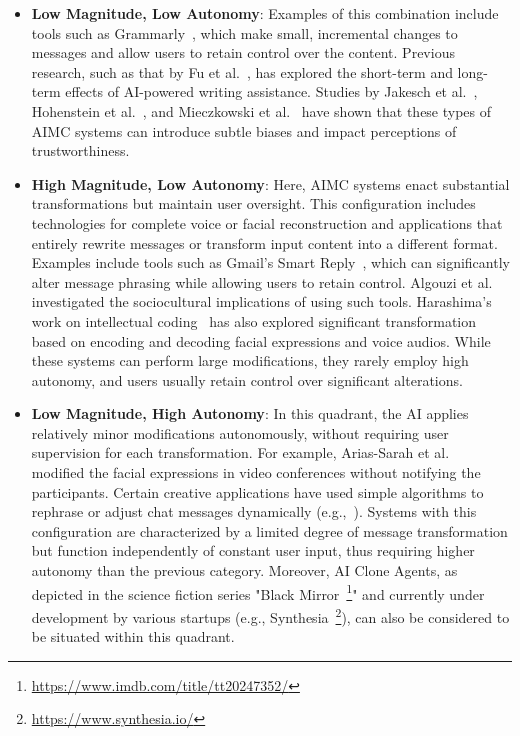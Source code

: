 \begin{itemize}
    
    \item \textbf{Low Magnitude, Low Autonomy}: Examples of this combination include tools such as Grammarly~\cite{Grammarly}, which make small, incremental changes to messages and allow users to retain control over the content. Previous research, such as that by Fu et al.~\cite{Fu2024FromText}, has explored the short-term and long-term effects of AI-powered writing assistance. Studies by Jakesch et al.~\cite{Jakesch2019AIMC}, Hohenstein et al.~\cite{Hohenstein2023AIMC}, and Mieczkowski et al.~\cite{Mieczkowski2021AIMC} have shown that these types of AIMC systems can introduce subtle biases and impact perceptions of trustworthiness.

    \item \textbf{High Magnitude, Low Autonomy}: Here, AIMC systems enact substantial transformations but maintain user oversight. This configuration includes technologies for complete voice or facial reconstruction and applications that entirely rewrite messages or transform input content into a different format. Examples include tools such as Gmail's Smart Reply~\cite{GmailSmartReply}, which can significantly alter message phrasing while allowing users to retain control. Algouzi et al.~\cite{Algouzi2023Gmail} investigated the sociocultural implications of using such tools. Harashima's work on intellectual coding~\cite{harashima1991intelligent} has also explored significant transformation based on encoding and decoding facial expressions and voice audios. While these systems can perform large modifications, they rarely employ high autonomy, and users usually retain control over significant alterations.
    
    \item \textbf{Low Magnitude, High Autonomy}: In this quadrant, the AI applies relatively minor modifications autonomously, without requiring user supervision for each transformation. For example, Arias-Sarah et al. ~\cite{sarah2024face}  modified the facial expressions in video conferences without notifying the participants. Certain creative applications have used simple algorithms to rephrase or adjust chat messages dynamically (e.g.,~\cite{mwitm}). Systems with this configuration are characterized by a limited degree of message transformation but function independently of constant user input, thus requiring higher autonomy than the previous category. Moreover, AI Clone Agents, as depicted in the science fiction series "Black Mirror~\footnote{\url{https://www.imdb.com/title/tt20247352/}}" and currently under development by various startups (e.g., Synthesia~\footnote{\url{https://www.synthesia.io/}}), can also be considered to be situated within this quadrant.
    

\end{itemize}
